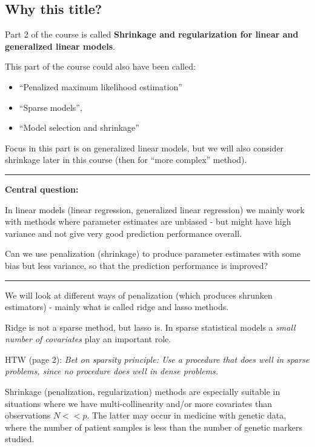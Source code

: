 \documentclass[
  letterpaper,
  DIV=11,
  numbers=noendperiod]{scrartcl}
\providecommand{\tightlist}{%
  \setlength{\itemsep}{0pt}\setlength{\parskip}{0pt}}\usepackage{longtable,booktabs,array}
\begin{document}
\hypertarget{why-this-title}{%
\subsection{Why this title?}\label{why-this-title}}

Part 2 of the course is called \textbf{Shrinkage and regularization for
linear and generalized linear models}.

This part of the course could also have been called:

\begin{itemize}
\tightlist
\item
  ``Penalized maximum likelihood estimation''
\item
  ``Sparse models'',
\item
  ``Model selection and shrinkage''
\end{itemize}

Focus in this part is on generalized linear models, but we will also
consider shrinkage later in this course (then for ``more complex''
method).

\begin{center}\rule{0.5\linewidth}{0.5pt}\end{center}

\textbf{Central question:}

In linear models (linear regression, generalized linear regression) we
mainly work with methods where parameter estimates are unbiased - but
might have high variance and not give very good prediction performance
overall.

Can we use penalization (shrinkage) to produce parameter estimates with
some bias but less variance, so that the prediction performance is
improved?

\begin{center}\rule{0.5\linewidth}{0.5pt}\end{center}

We will look at different ways of penalization (which produces shrunken
estimators) - mainly what is called ridge and lasso methods.

Ridge is not a sparse method, but lasso is. In sparse statistical models
a \emph{small number of covariates} play an important role.

HTW (page 2): \emph{Bet on sparsity principle: Use a procedure that does
well in sparse problems, since no procedure does well in dense
problems.}

Shrinkage (penalization, regularization) methods are especially suitable
in situations where we have multi-collinearity and/or more covariates
than observations \(N<<p\). The latter may occur in medicine with
genetic data, where the number of patient samples is less than the
number of genetic markers studied.
\end{document}
